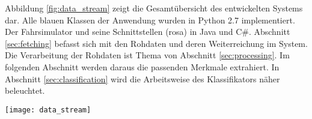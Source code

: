 \label{chap:implementation}

Abbildung \ref{fig:data_stream} zeigt die Gesamtübersicht des entwickelten Systems dar. Alle blauen Klassen der Anwendung wurden in Python 2.7 implementiert. Der Fahrsimulator und seine Schnittstellen (rosa) in Java und C\#. Abschnitt \ref{sec:fetching} befasst sich mit den Rohdaten und deren Weiterreichung im System. Die Verarbeitung der Rohdaten ist Thema von Abschnitt \ref{sec:processing}. Im folgenden Abschnitt werden daraus die passenden Merkmale extrahiert. In Abschnitt \ref{sec:classification} wird die Arbeitsweise des Klassifikators näher beleuchtet. 


\begin{figure*} 
  \begin{center}
    \texttt{[image: data\_stream]}
    \caption[Aufbau]{Das entwickelte System zur Müdigkeitserkennung. \label{fig:data_stream}}
  \end{center}
\end{figure*}